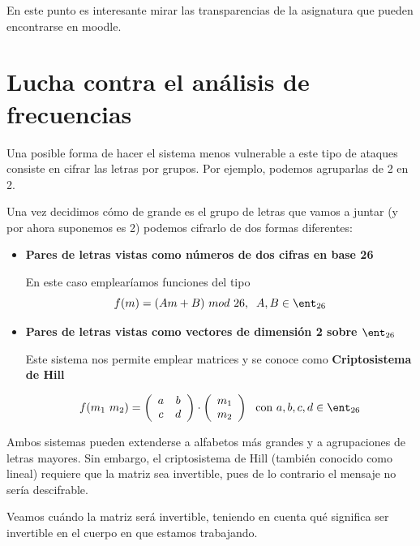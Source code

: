 En este punto es interesante mirar las transparencias de la asignatura que pueden encontrarse en moodle.

\section{Lucha contra el análisis de frecuencias}
Una posible forma de hacer el sistema menos vulnerable a este tipo de ataques consiste en cifrar las letras por grupos. Por ejemplo, podemos agruparlas de 2 en 2.

Una vez decidimos cómo de grande es el grupo de letras que vamos a juntar (y por ahora suponemos es 2) podemos cifrarlo de dos formas diferentes:

\begin{itemize}
\item \textbf{Pares de letras vistas como números de dos cifras en base 26}

En este caso emplearíamos funciones del tipo
\[f(m)= (Am + B) \ mod \ 26, \;\; A,B \in \ent_{26}\]

\item \textbf{Pares de letras vistas como vectores de dimensión 2 sobre $\ent_{26}$}

Este sistema nos permite emplear matrices y se conoce como \textbf{Criptosistema de Hill}

\[ f(m_1\ m_2) = \left( \begin{array}{cc}
a & b \\
c & d  \end{array} \right) \cdot\left( \begin{array}{c}
m_1 \\
m_2  \end{array} \right) \ \text{ con } a,b,c,d \in \ent_{26}\]
\end{itemize}

Ambos sistemas pueden extenderse a alfabetos más grandes y a agrupaciones de letras mayores. Sin embargo, el criptosistema de Hill (también conocido como lineal) requiere que la matriz sea invertible, pues de lo contrario el mensaje no sería descifrable.

Veamos cuándo la matriz será invertible, teniendo en cuenta qué significa ser invertible en el cuerpo en que estamos trabajando.

